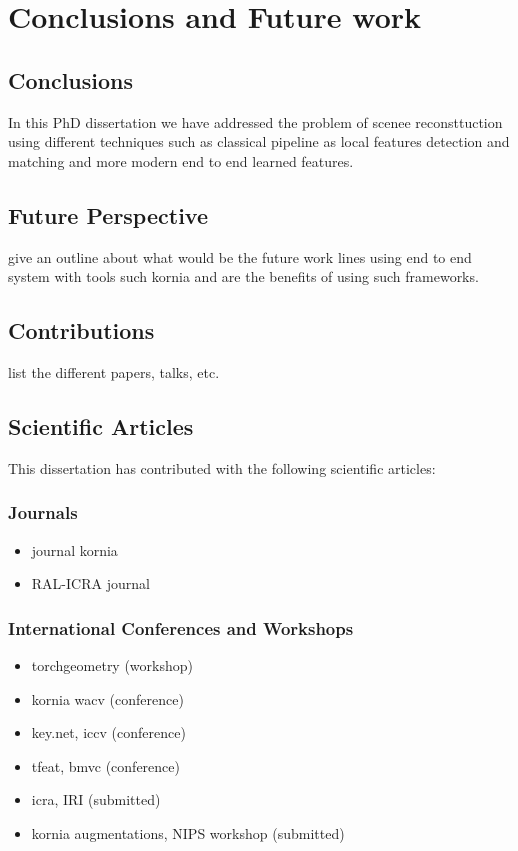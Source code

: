 
\chapter{Conclusions and Future work}
\label{chap:end}

\section{Conclusions}

In this PhD dissertation we have addressed the problem of scenee reconsttuction using different techniques such as classical pipeline as local features detection and matching and more modern end to end learned features. 

\section{Future Perspective}

give an outline about what would be the future work lines using end to end system with tools such kornia and are the benefits of using such frameworks.

\section{Contributions}

list the different papers, talks, etc.

\section{Scientific Articles}

This dissertation has contributed with the following scientific articles:

\subsection{Journals}
\begin{itemize}
\item journal kornia
\item RAL-ICRA journal
\end{itemize}

\subsection{International Conferences and Workshops}
\begin{itemize}
\item torchgeometry (workshop)
\item kornia wacv (conference)
\item key.net, iccv (conference)
\item tfeat, bmvc (conference)
\item icra, IRI (submitted)
\item kornia augmentations, NIPS workshop (submitted)
\end{itemize}

